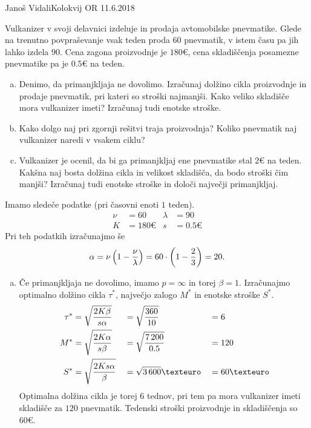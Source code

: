 \begin{naloga}{Janoš Vidali}{Kolokvij OR 11.6.2018}
\begin{vprasanje}
Vulkanizer v svoji delavnici izdeluje in prodaja avtomobilske pnevmatike.
Glede na trenutno povpraševanje vsak teden proda $60$ pnevmatik,
v istem času pa jih lahko izdela $90$.
Cena zagona proizvodnje je $180 €$,
cena skladiščenja posamezne pnevmatike pa je $0.5 €$ na teden.

\begin{enumerate}[(a)]
\item Denimo, da primanjkljaja ne dovolimo.
Izračunaj dolžino cikla pro\-iz\-vod\-nje in prodaje pnevmatik,
pri kateri so stroški najmanjši.
Kako veliko skladišče mora vulkanizer imeti?
Izračunaj tudi enotske stroške.

\item Kako dolgo naj pri zgornji rešitvi traja proizvodnja?
Koliko pnevmatik naj vulkanizer naredi v vsakem ciklu?

\item Vulkanizer je ocenil,
da bi ga primanjkljaj ene pnevmatike stal $2 €$ na teden.
Kakšna naj bosta dolžina cikla in velikost skladišča,
da bodo stroški čim manjši?
Izračunaj tudi enotske stroške in določi največji primanjkljaj.
\end{enumerate}
\end{vprasanje}

\begin{odgovor}
Imamo sledeče podatke (pri časovni enoti $1$ teden).
\begin{align*}
\nu &= 60 &
\lambda &= 90 \\
K &= 180 € &
s &= 0.5 €
\end{align*}
Pri teh podatkih izračunajmo še
$$
\alpha = \nu \left(1 - {\nu \over \lambda}\right)
= 60 \cdot \left(1 - {2 \over 3}\right) = 20 .
$$

\begin{enumerate}[(a)]
\item Če primanjkljaja ne dovolimo, imamo $p = \infty$ in torej $\beta = 1$.
Izračunajmo optimalno dolžino cikla $\tau^*$,
največjo zalogo $M^*$ in enotske stroške $S^*$.
\begin{alignat*}{3}
\tau^* &= \sqrt{2K \beta \over s \alpha}
&&= \sqrt{360 \over 10} &&= 6 \\
M^* &= \sqrt{2K \alpha \over s \beta}
&&= \sqrt{7\,200 \over 0.5} &&= 120 \\
S^* &= \sqrt{2Ks \alpha \over \beta}
&&= \sqrt{3\,600} € &&= 60 €
\end{alignat*}
Optimalna dolžina cikla je torej $6$ tednov,
pri tem pa mora vulkanizer imeti skladišče za $120$ pnevmatik.
Tedenski stroški proizvodnje in skladiščenja so $60 €$.


\end{enumerate}
\end{odgovor}
\end{naloga}

